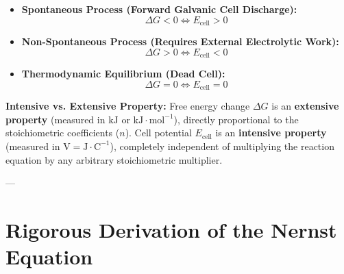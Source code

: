 \begin{conceptbox}
\begin{itemize}[leftmargin=*]
    \item \textbf{Spontaneous Process (Forward Galvanic Cell Discharge):}
    \begin{equation}
        \Delta G < 0 \iff E_{\text{cell}} > 0
    \end{equation}
    \item \textbf{Non-Spontaneous Process (Requires External Electrolytic Work):}
    \begin{equation}
        \Delta G > 0 \iff E_{\text{cell}} < 0
    \end{equation}
    \item \textbf{Thermodynamic Equilibrium (Dead Cell):}
    \begin{equation}
        \Delta G = 0 \iff E_{\text{cell}} = 0
    \end{equation}
\end{itemize}
\textbf{Intensive vs. Extensive Property:}
Free energy change $\Delta G$ is an \textbf{extensive property} (measured in $\text{kJ}$ or $\text{kJ}\cdot\text{mol}^{-1}$), directly proportional to the stoichiometric coefficients ($n$). Cell potential $E_{\text{cell}}$ is an \textbf{intensive property} (measured in $\text{V} = \text{J}\cdot\text{C}^{-1}$), completely independent of multiplying the reaction equation by any arbitrary stoichiometric multiplier.
\end{conceptbox}

---

\section{Rigorous Derivation of the Nernst Equation}

